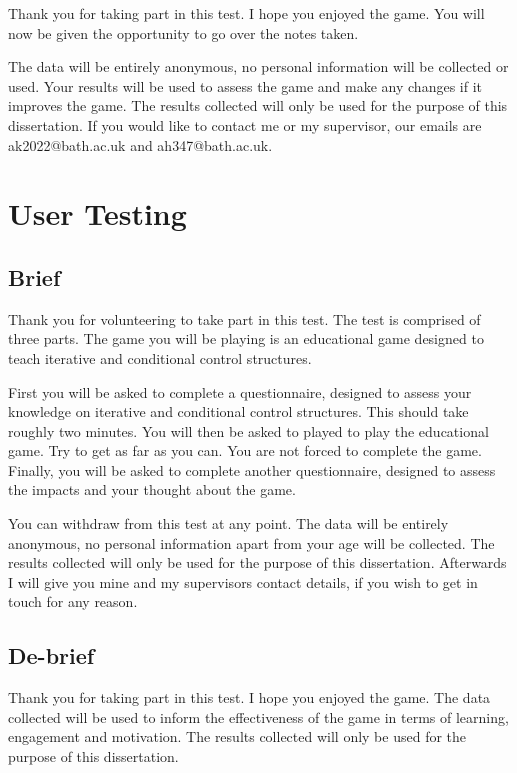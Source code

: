 \documentclass[a4paper,11.5pt]{report}
\numberwithin{figure}{section}
\numberwithin{table}{section}
\numberwithin{equation}{section}
\numberwithin{equation}{section}
\begin{document}
Thank you for taking part in this test. I hope you enjoyed the game. You will now be given the opportunity to go over the notes taken. 

The data will be entirely anonymous, no personal information will be collected or used. Your results will be used to assess the game and make any changes if it improves the game. The results collected will only be used for the purpose of this dissertation. If you would like to contact me or my supervisor, our emails are ak2022@bath.ac.uk and ah347@bath.ac.uk. 


\chapter{User Testing} \label{app:usertesting}

\section{Brief}

Thank you for volunteering to take part in this test. The test is comprised of three parts. The game you will be playing is an educational game designed to teach iterative and conditional control structures.

First you will be asked to complete a questionnaire, designed to assess your knowledge on iterative and conditional control structures. This should take roughly two minutes. You will then be asked to played to play the educational game. Try to get as far as you can. You are not forced to complete the game. Finally, you will be asked to complete another questionnaire, designed to assess the impacts and your thought about the game.

You can withdraw from this test at any point. The data will be entirely anonymous, no personal information apart from your age will be collected. The results collected will only be used for the purpose of this dissertation. Afterwards I will give you mine and my supervisors contact details, if you wish to get in touch for any reason.

\section{De-brief}

Thank you for taking part in this test. I hope you enjoyed the game. The data collected will be used to inform the effectiveness of the game in terms of learning, engagement and motivation. The results collected will only be used for the purpose of this dissertation. 
\end{document}
